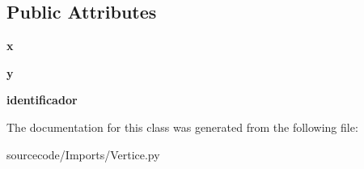 \subsection*{Public Attributes}
\begin{DoxyCompactItemize}
\item 
\mbox{\label{class_imports_1_1_vertice_1_1_vertice_aef1b3062fd8276e1d16b12ffda47494b}} 
{\bfseries x}
\item 
\mbox{\label{class_imports_1_1_vertice_1_1_vertice_af85eb9467fc87af9dba7b37e60387a1a}} 
{\bfseries y}
\item 
\mbox{\label{class_imports_1_1_vertice_1_1_vertice_ac78741bd9dca11609db7fd7ac2fffaf2}} 
{\bfseries identificador}
\end{DoxyCompactItemize}


The documentation for this class was generated from the following file\+:\begin{DoxyCompactItemize}
\item 
sourcecode/\+Imports/Vertice.\+py\end{DoxyCompactItemize}
